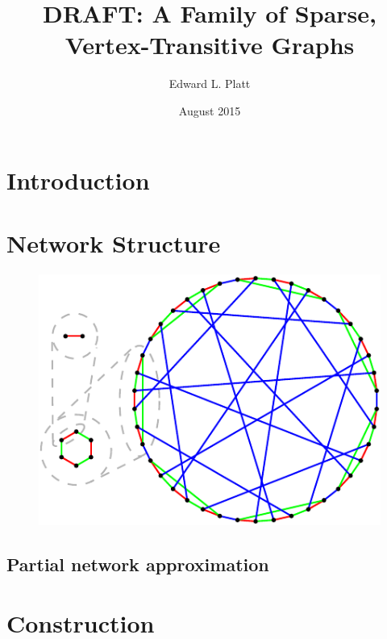 \documentclass[twocolumn]{article}
\title{DRAFT: A Family of Sparse, Vertex-Transitive Graphs}
\author{Edward L. Platt}
\date{August 2015}
\begin{document}
\maketitle

\section{Introduction}

\section{Network Structure}
\begin{figure}
\begin{center}
\includegraphics{g123}
\caption{
\label{fig:g123}
}
\end{center}
\end{figure}

\subsection{Partial network approximation}

\section{Construction}
\end{document}
